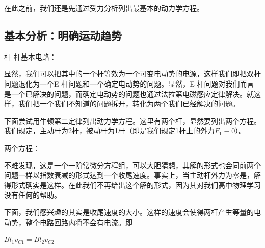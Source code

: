 \documentclass{ctexbook}
\begin{document}
	在此之前，我们还是先通过受力分析列出最基本的动力学方程。
	
	\subsection{基本分析：明确运动趋势}
	
	杆-杆基本电路：
	
	\hspace*{\fill}
	
	\hspace*{\fill}
	
	\hspace*{\fill}
	
	\hspace*{\fill}
	
	\hspace*{\fill}
	
	\hspace*{\fill}
	
	\hspace*{\fill}
	
	\hspace*{\fill}
	
	显然，我们可以把其中的一个杆等效为一个可变电动势的电源，这样我们即把双杆问题退化为一个E-杆问题和一个确定电动势的问题。显然，E-杆问题对我们而言是一个已解决的问题，而确定电动势的问题也通过法拉第电磁感应定律解决。就这样，我们把一个我们不知道的问题拆开，转化为两个我们已经解决的问题。
	
	下面尝试用牛顿第二定律列出动力学方程。这里有两个杆，显然要列出两个方程。我们规定，主动杆为2杆，被动杆为1杆（即是我们规定1杆上的外力$F_1 \equiv 0$）。
	
	两个方程：
	
	\hspace*{\fill}
	
	\hspace*{\fill}
	
	\hspace*{\fill}
	
	\hspace*{\fill}
	
	不难发现，这是一个一阶常微分方程组，可以大胆猜想，其解的形式也会同前两个问题一样以指数衰减的形式达到一个收尾速度。事实上，当主动杆外力为零是，解得形式确实是这样。在此我们不再给出这个解的形式，因为其对我们高中物理学习没有任何的帮助。
	
	下面，我们感兴趣的其实是收尾速度的大小。这样的速度会使得两杆产生等量的电动势，整个电路回路内将不会有电流。即
	
	\centerline{$B l_1 v_{C1}=B l_2 v_{C2}$}
	
\end{document}
